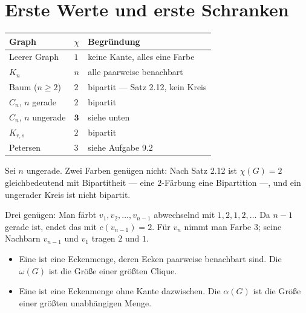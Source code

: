 \section{Erste Werte und erste Schranken}

\begin{merksatz}
\begin{center}
{\small
\renewcommand{\arraystretch}{1.48}
\begin{tabular}{@{}P{2.4cm}P{1.6cm}P{4.4cm}@{}}
\toprule
\textbf{Graph} & $\chi$ & \textbf{Begründung}\\
\midrule
Leerer Graph & $1$ & keine Kante, alles eine Farbe\\
$K_n$ & $n$ & alle paarweise benachbart\\
Baum ($n\ge2$) & $2$ & bipartit --- Satz 2.12, kein Kreis\\
$C_n$, $n$ gerade & $2$ & bipartit\\
$C_n$, $n$ ungerade & $\mathbf{3}$ & siehe unten\\
$K_{r,s}$ & $2$ & bipartit\\
Petersen & $3$ & siehe Aufgabe 9.2\\
\bottomrule
\end{tabular}}
\end{center}

Sei $n$ ungerade. Zwei Farben genügen nicht: Nach Satz 2.12 ist $\chi(G) = 2$ gleichbedeutend mit Bipartitheit --- eine $2$-Färbung  eine Bipartition ---, und ein ungerader Kreis ist nicht bipartit.

Drei genügen: Man färbt $v_1, v_2, \ldots, v_{n-1}$ abwechselnd mit $1, 2, 1, 2, \ldots$ Da $n-1$ gerade ist, endet das mit $c(v_{n-1}) = 2$. Für $v_n$ nimmt man Farbe $3$; seine Nachbarn $v_{n-1}$ und $v_1$ tragen $2$ und $1$. \checkmark
\end{merksatz}

\begin{definition}
\begin{itemize}[leftmargin=1.4em, itemsep=3pt]
\item Eine  ist eine Eckenmenge, deren Ecken paarweise benachbart sind. Die  $\omega(G)$ ist die Größe einer größten Clique.
\item Eine  ist eine Eckenmenge ohne Kante dazwischen. Die  $\alpha(G)$ ist die Größe einer größten unabhängigen Menge.
\end{itemize}
\end{definition}

